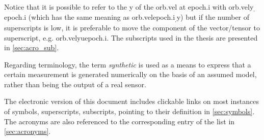 Notice that it is possible to refer to the \acl{y} of the \acl{orb.vel} at \acl{epoch.i} with \acs{orb.vel}\acs{y}$_,$\acs{epoch.i} (which has the same meaning as \acs{orb.vel}\acs{epoch.i}$_,$\acs{y}) but if the number of superscripts is low, it is preferable to move the component of the vector\slash tensor to superscript, e.g. \acs{orb.vel}\acs{yu}\acs{epoch.i}. The subscripts used in the thesis are presented in \ref{sec:acro_sub}.


Regarding terminology, the term \emph{synthetic} is used as a means to express that a certain measurement is generated numerically on the basis of an assumed model, rather than being the output of a real sensor.

The electronic version of this document includes clickable links on most instances of symbols, superscripts, subscripts, pointing to their definition in \ref{sec:symbols}. The acronyms are also referenced to the corresponding entry of the list in \ref{sec:acronyms}.
\fi

